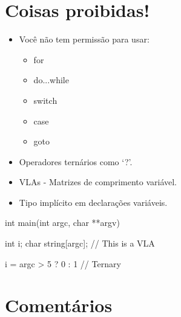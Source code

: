 \documentclass{42-pt}
\begin{document}
    \section{Coisas proibidas!}

        \begin{itemize}

            \item Você não tem permissão para usar:

                \begin{itemize}

                    \item for
                    \item do...while
                    \item switch
                    \item case
                    \item goto

                \end{itemize}

            \item Operadores ternários como `?'.

            \item VLAs - Matrizes de comprimento variável.

            \item Tipo implícito em declarações variáveis.

        \end{itemize}
        \begin{42ccode}
    int main(int argc, char **argv)
    {
        int     i;
        char    string[argc]; // This is a VLA

        i = argc > 5 ? 0 : 1 // Ternary
    }
        \end{42ccode}
        \newpage

    \section{Comentários}
\end{document}
